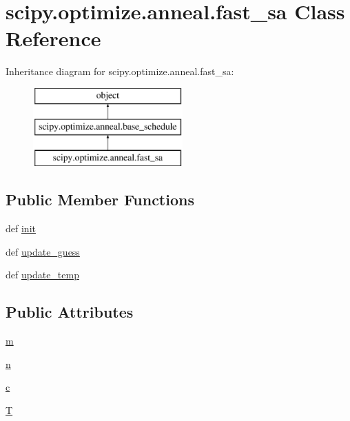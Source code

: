 \hypertarget{classscipy_1_1optimize_1_1anneal_1_1fast__sa}{}\section{scipy.\+optimize.\+anneal.\+fast\+\_\+sa Class Reference}
\label{classscipy_1_1optimize_1_1anneal_1_1fast__sa}
Inheritance diagram for scipy.\+optimize.\+anneal.\+fast\+\_\+sa\+:\begin{figure}[H]
\begin{center}
\leavevmode
\includegraphics[height=3.000000cm]{classscipy_1_1optimize_1_1anneal_1_1fast__sa}
\end{center}
\end{figure}
\subsection*{Public Member Functions}
\begin{DoxyCompactItemize}
\item 
def \hyperlink{classscipy_1_1optimize_1_1anneal_1_1fast__sa_ad2685c79ba64bf41ff1f24e720058276}{init}
\item 
def \hyperlink{classscipy_1_1optimize_1_1anneal_1_1fast__sa_ae837e55a01ed410cb7d6f68ac4643adb}{update\+\_\+guess}
\item 
def \hyperlink{classscipy_1_1optimize_1_1anneal_1_1fast__sa_a4c4a37e85185693433a1b5b3b2c78753}{update\+\_\+temp}
\end{DoxyCompactItemize}
\subsection*{Public Attributes}
\begin{DoxyCompactItemize}
\item 
\hyperlink{classscipy_1_1optimize_1_1anneal_1_1fast__sa_ac61ef5fd90499f3c5c6c8090b3f8da0a}{m}
\item 
\hyperlink{classscipy_1_1optimize_1_1anneal_1_1fast__sa_a6f59bc186b25426cc8681e03ff041b95}{n}
\item 
\hyperlink{classscipy_1_1optimize_1_1anneal_1_1fast__sa_a28557e4b493e347ed9bd8cecaa9a777f}{c}
\item 
\hyperlink{classscipy_1_1optimize_1_1anneal_1_1fast__sa_a7a7db061a70764ec3896039a5887112f}{T}
\end{DoxyCompactItemize}


